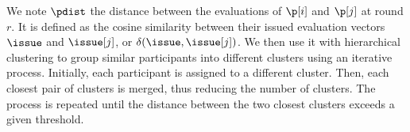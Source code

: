 

We note $\pdist$ the distance between the evaluations of $\p[i]$ and $\p[j]$ at round $r$.
It is defined as the cosine similarity between their issued evaluation vectors $\issue$ and $\issue[j]$, or $\delta(\issue,\issue[j])$.
We then use it with hierarchical clustering to group similar participants into different clusters using an iterative process.
Initially, each participant is assigned to a different cluster.
Then, each closest pair of clusters is merged, thus reducing the number of clusters.
The process is repeated until the distance between the two closest clusters exceeds a given threshold. 

